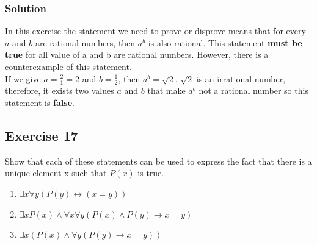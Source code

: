 \documentclass{article}
\begin{document}
\subsubsection*{Solution}
In this exercise the statement we need to prove or disprove means that for every $a$ and $b$ are rational numbers, then $a^b$ is also rational. This statement \textbf{must be true} for all value of a and b are rational numbers. However, there is a counterexample of this statement.\\

If we give $a = \frac{2}{1} = 2$ and $b = \frac{1}{2}$, then $a^b = \sqrt{2}$. $\sqrt{2}$ is an irrational number, therefore, it exists two values $a$ and $b$ that make $a^b$ not a rational number so this statement is \textbf{false}.
\subsection*{Exercise 17}
Show that each of these statements can be used to express the fact that there is a unique element x such that $P(x)$ is true.
\begin{enumerate} [label = (\alph*)]
    \item $\exists x \forall y(P(y) \leftrightarrow (x = y))$
    \item $\exists xP(x) \land \forall x \forall y(P(x) \land P(y) \to x = y)$
    \item $\exists x(P(x) \land \forall y(P(y) \to x = y))$
\end{enumerate}
\end{document}
